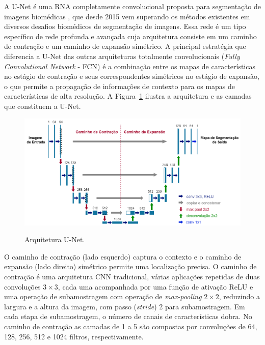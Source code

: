 A U-Net é uma RNA completamente convolucional proposta para segmentação de imagens biomédicas \cite{ronneberger2015u}, que desde 2015 vem superando os métodos existentes em diversos desafios biomédicos de segmentação de imagens. Essa rede é um tipo específico de rede profunda e avançada cuja arquitetura consiste em um caminho de contração e um caminho de expansão simétrico. A principal estratégia que diferencia a U-Net das outras arquiteturas totalmente convolucionais (\textit{Fully Convolutional Network} - FCN) é a combinação entre os mapas de características no estágio de contração e seus correspondentes simétricos no estágio de expansão, o que permite a propagação de informações de contexto para os mapas de características de alta resolução. A Figura~\ref{fig:arquitetura_unet} ilustra a arquitetura e as camadas que constituem a U-Net.

\begin{figure}[!ht]
    \centering
    \caption{Arquitetura U-Net.}
    \includegraphics[width=1\textwidth]{figuras/arquitetura-Unet.png}
    \label{fig:arquitetura_unet}
\end{figure}

O caminho de contração (lado esquerdo) captura o contexto e o caminho de expansão (lado direito) simétrico permite uma localização precisa. O caminho de contração é uma arquitetura CNN tradicional, várias aplicações repetidas de duas convoluções $3\times3$, cada uma acompanhada por uma função de ativação ReLU e uma operação de subamostragem com operação de \textit{max-pooling} $2\times2$, reduzindo a largura e a altura da imagem, com passo (\textit{stride}) 2 para subamostragem. Em cada etapa de subamostragem, o número de canais de características dobra.  No caminho de contração as camadas de 1 a 5 são compostas por convoluções de 64, 128, 256, 512 e 1024 filtros, respectivamente.

